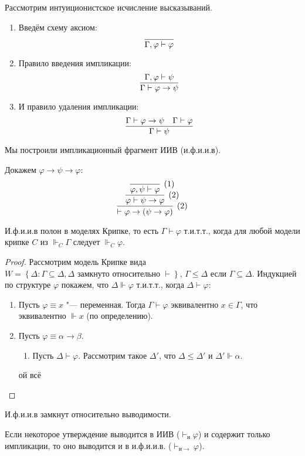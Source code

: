 \begin{definition}
    Рассмотрим интуиционистское исчисление высказываний.
    \begin{enumerate}
        \item Введём схему аксиом:
        \[
            \infer{\Gamma, \varphi \vdash \varphi}{}
        \]
        \item Правило введения импликации:
        \[
            \infer{\Gamma \vdash \varphi \rightarrow \psi}{\Gamma, \varphi \vdash \psi}
        \]
        \item И правило удаления импликации:
        \[
            \infer{\Gamma \vdash \psi}{\Gamma \vdash \varphi \rightarrow \psi & \Gamma \vdash \varphi}
        \]
    \end{enumerate}

    Мы построили импликационный фрагмент ИИВ (и.ф.и.и.в).
\end{definition}

\begin{example} Докажем $\varphi \rightarrow \psi \rightarrow \varphi$:
\[
    \infer[(2)]
        { \vdash \varphi \rightarrow (\psi \rightarrow \varphi) }
        { \infer[(2)]
            { \varphi \vdash \psi \rightarrow \varphi }
            { \infer[(1)]
                { \varphi, \psi \vdash \varphi}
                {}
            }
        }
\]
\end{example}

\begin{theorem}
    И.ф.и.и.в полон в моделях Крипке, то есть $\Gamma \vdash \varphi$ т.и.т.т.,
    когда для любой модели крипке $C$ из $\Vdash_C \Gamma$ следует $\Vdash_C \varphi$.
\end{theorem}

\begin{proof}
    Рассмотрим модель Крипке вида $W = \left\{\Delta : \Gamma \subseteq \Delta, \Delta\text{ замкнуто относительно }\vdash\right\}$,
    $\Gamma \leq \Delta$ если $\Gamma \subseteq \Delta$.
    Индукцией по структуре $\varphi$ покажем, что $\Delta \Vdash \varphi$ т.и.т.т., когда $\Delta \vdash \varphi$:
    \begin{enumerate}
        \item Пусть $\varphi \equiv x$ "--- переменная. Тогда $\Gamma \vdash \varphi$ эквивалентно $x \in \Gamma$, что эквивалентно $\Vdash x$ (по определению).
        \item Пусть $\varphi \equiv \alpha \rightarrow \beta$.
        \begin{enumerate}[label=(\asbuk*)]
            \item Пусть $\Delta \vdash \varphi$.
            Рассмотрим такое $\Delta'$, что $\Delta \leq \Delta'$ и $\Delta' \Vdash \alpha$.
        \end{enumerate}
        ой всё \todo
    \end{enumerate}
\end{proof}

\begin{corollary}
    И.ф.и.и.в замкнут относительно выводимости.
\end{corollary}
Если некоторое утверждение выводится в ИИВ ($\vdash_{и} \varphi$) и содержит только импликации,
то оно выводится и в и.ф.и.и.в. ($\vdash_{и \rightarrow} \varphi$).
